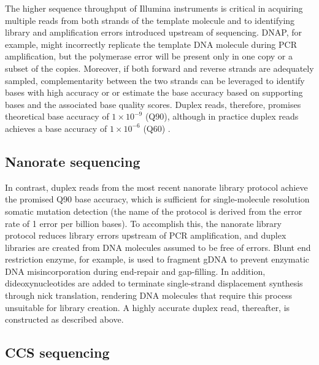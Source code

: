 The higher sequence throughput of Illumina instruments is critical in acquiring multiple reads from both strands of the template molecule and to identifying library and amplification errors introduced upstream of sequencing. DNAP, for example, might incorrectly replicate the template DNA molecule during PCR amplification, but the polymerase error will be present only in one copy or a subset of the copies. Moreover, if both forward and reverse strands are adequately sampled, complementarity between the two strands can be leveraged to identify bases with high accuracy or \cite{Schmitt2012-yr} or estimate the base accuracy \cite{Abascal2021-pk} based on supporting bases and the associated base quality scores. Duplex reads, therefore, promises theoretical base accuracy of $1 \times 10^{-9}$ (Q90), although in practice duplex reads achieves a base accuracy of $1 \times 10^{-6}$ (Q60) \cite{Schmitt2012-yr}.

\subsection{Nanorate sequencing}

In contrast, duplex reads from the most recent nanorate library protocol achieve the promised Q90 base accuracy, which is sufficient for single-molecule resolution somatic mutation detection \cite{Abascal2021-pk} (the name of the protocol is derived from the error rate of 1 error per billion bases). To accomplish this, the nanorate library protocol reduces library errors upstream of PCR amplification, and duplex libraries are created from DNA molecules assumed to be free of errors. Blunt end restriction enzyme, for example, is used to fragment gDNA to prevent enzymatic DNA misincorporation during end-repair and gap-filling. In addition, dideoxynucleotides are added to terminate single-strand displacement synthesis through nick translation, rendering DNA molecules that require this process unsuitable for library creation. A highly accurate duplex read, thereafter, is constructed as described above.  

\subsection{CCS sequencing}

